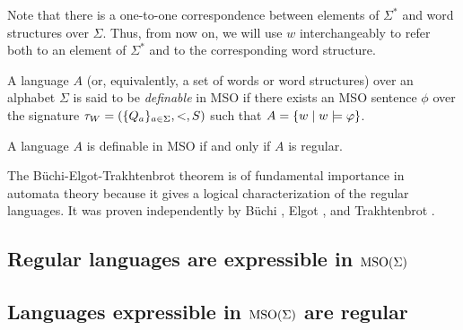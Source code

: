 \documentclass[11pt,twoside=off,numbers=noenddot]{scrbook}
\begin{document}
\begin{abuse}
  Note that there is a one-to-one correspondence between elements of $\Sigma^\ast$ and word structures over $\Sigma$. Thus, from now on, we will use $w$ interchangeably to refer both to an element of $\Sigma^\ast$ and to the corresponding word structure.
\end{abuse}

\begin{definition}
  A language $A$ (or, equivalently, a set of words or word structures) over an alphabet $\Sigma$ is said to be \emph{definable} in MSO if there exists an MSO sentence $\phi$ over the signature $\tau_W = (\{ Q_a \}_{a \in \Sigma}, <, S)$ such that $A = \{ w \mid w \models \varphi \}$.
\end{definition}

\begin{theorem}
  A language $A$ is definable in MSO if and only if $A$ is regular.
\end{theorem}

\begin{remark}
  The Büchi-Elgot-Trakhtenbrot theorem is of fundamental importance in automata theory because it gives a logical characterization of the regular languages. It was proven independently by Büchi \cite{buchi1960weak}, Elgot \cite{elgot1961decision}, and Trakhtenbrot \cite{trakhtenbrot1962finite}.
\end{remark}

\subsection{Regular languages are expressible in $\text{MSO}(\Sigma)$}

\subsection{Languages expressible in $\text{MSO}(\Sigma)$ are regular}

\printbibliography[nottype=image]
\end{document}
